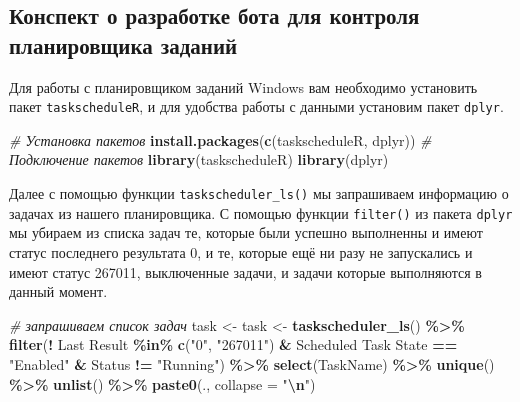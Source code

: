 \documentclass[
]{book}
\newenvironment{Shaded}{\begin{snugshade}}{\end{snugshade}}
\newcommand{\AttributeTok}[1]{\textcolor[rgb]{0.13,0.29,0.53}{#1}}
\newcommand{\CommentTok}[1]{\textcolor[rgb]{0.56,0.35,0.01}{\textit{#1}}}
\newcommand{\FunctionTok}[1]{\textcolor[rgb]{0.13,0.29,0.53}{\textbf{#1}}}
\newcommand{\NormalTok}[1]{#1}
\newcommand{\OtherTok}[1]{\textcolor[rgb]{0.56,0.35,0.01}{#1}}
\newcommand{\SpecialCharTok}[1]{\textcolor[rgb]{0.81,0.36,0.00}{\textbf{#1}}}
\newcommand{\StringTok}[1]{\textcolor[rgb]{0.31,0.60,0.02}{#1}}
\begin{document}
\subsection{Конспект о разработке бота для контроля планировщика заданий}\label{ux43aux43eux43dux441ux43fux435ux43aux442-ux43e-ux440ux430ux437ux440ux430ux431ux43eux442ux43aux435-ux431ux43eux442ux430-ux434ux43bux44f-ux43aux43eux43dux442ux440ux43eux43bux44f-ux43fux43bux430ux43dux438ux440ux43eux432ux449ux438ux43aux430-ux437ux430ux434ux430ux43dux438ux439}

Для работы с планировщиком заданий Windows вам необходимо установить пакет \texttt{taskscheduleR}, и для удобства работы с данными установим пакет \texttt{dplyr}.

\begin{Shaded}
\begin{Highlighting}[]
\CommentTok{\# Установка пакетов}
\FunctionTok{install.packages}\NormalTok{(}\FunctionTok{c}\NormalTok{(}\StringTok{\textquotesingle{}taskscheduleR\textquotesingle{}}\NormalTok{, }\StringTok{\textquotesingle{}dplyr\textquotesingle{}}\NormalTok{))}
\CommentTok{\# Подключение пакетов}
\FunctionTok{library}\NormalTok{(taskscheduleR)}
\FunctionTok{library}\NormalTok{(dplyr)}
\end{Highlighting}
\end{Shaded}

Далее с помощью функции \texttt{taskscheduler\_ls()} мы запрашиваем информацию о задачах из нашего планировщика. С помощью функции \texttt{filter()} из пакета \texttt{dplyr} мы убираем из списка задач те, которые были успешно выполненны и имеют статус последнего результата 0, и те, которые ещё ни разу не запускались и имеют статус 267011, выключенные задачи, и задачи которые выполняются в данный момент.

\begin{Shaded}
\begin{Highlighting}[]
\CommentTok{\# запрашиваем список задач}
\NormalTok{task }\OtherTok{\textless{}{-}}\NormalTok{ task }\OtherTok{\textless{}{-}} \FunctionTok{taskscheduler\_ls}\NormalTok{() }\SpecialCharTok{\%\textgreater{}\%}
        \FunctionTok{filter}\NormalTok{(}\SpecialCharTok{!} \StringTok{\textasciigrave{}}\AttributeTok{Last Result}\StringTok{\textasciigrave{}}  \SpecialCharTok{\%in\%} \FunctionTok{c}\NormalTok{(}\StringTok{"0"}\NormalTok{, }\StringTok{"267011"}\NormalTok{) }\SpecialCharTok{\&} 
               \StringTok{\textasciigrave{}}\AttributeTok{Scheduled Task State}\StringTok{\textasciigrave{}} \SpecialCharTok{==} \StringTok{"Enabled"} \SpecialCharTok{\&} 
\NormalTok{               Status }\SpecialCharTok{!=} \StringTok{"Running"}\NormalTok{) }\SpecialCharTok{\%\textgreater{}\%}
        \FunctionTok{select}\NormalTok{(TaskName) }\SpecialCharTok{\%\textgreater{}\%}
        \FunctionTok{unique}\NormalTok{() }\SpecialCharTok{\%\textgreater{}\%}
        \FunctionTok{unlist}\NormalTok{() }\SpecialCharTok{\%\textgreater{}\%}
        \FunctionTok{paste0}\NormalTok{(., }\AttributeTok{collapse =} \StringTok{"}\SpecialCharTok{\textbackslash{}n}\StringTok{"}\NormalTok{)}
\end{Highlighting}
\end{Shaded}
\end{document}

